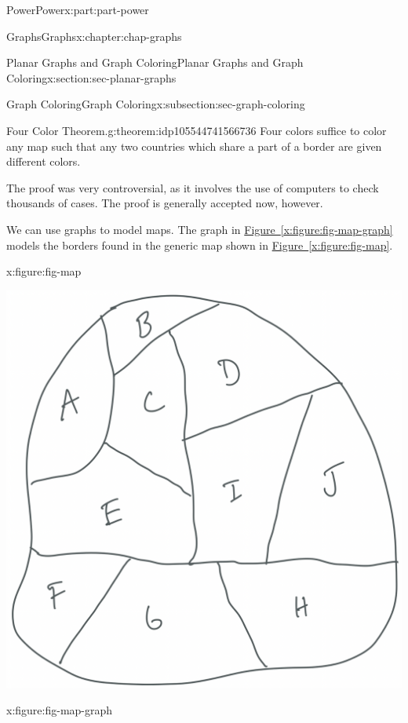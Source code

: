 \documentclass[oneside,10pt,]{book}
\newcommand{\xreffont}{\relax}
\numberwithin{equation}{section}
\begin{document}
\begin{partptx}{Power}{}{Power}{}{}{x:part:part-power}
\begin{chapterptx}{Graphs}{}{Graphs}{}{}{x:chapter:chap-graphs}
\begin{sectionptx}{Planar Graphs and Graph Coloring}{}{Planar Graphs and Graph Coloring}{}{}{x:section:sec-planar-graphs}
\begin{subsectionptx}{Graph Coloring}{}{Graph Coloring}{}{}{x:subsection:sec-graph-coloring}
\begin{theorem}{Four Color Theorem.}{}{g:theorem:idp105544741566736}%
Four colors suffice to color any map such that any two countries which share a part of a border are given different colors.%
\end{theorem}
The proof was very controversial, as it involves the use of computers to check thousands of cases. The proof is generally accepted now, however.%
\par
We can use graphs to model maps. The graph in \hyperref[x:figure:fig-map-graph]{Figure~{\xreffont\ref{x:figure:fig-map-graph}}} models the borders found in the generic map shown in \hyperref[x:figure:fig-map]{Figure~{\xreffont\ref{x:figure:fig-map}}}.%
\begin{figureptx}{}{x:figure:fig-map}{}%
\begin{image}{0.25}{0.5}{0.25}%
\includegraphics[width=\linewidth]{./images/map.png}
\end{image}%
\tcblower
\end{figureptx}%
\begin{figureptx}{}{x:figure:fig-map-graph}{}%
\begin{image}{0.25}{0.5}{0.25}%

\end{image}
\end{figureptx}
\end{subsectionptx}
\end{sectionptx}
\end{chapterptx}
\end{partptx}
\end{document}
